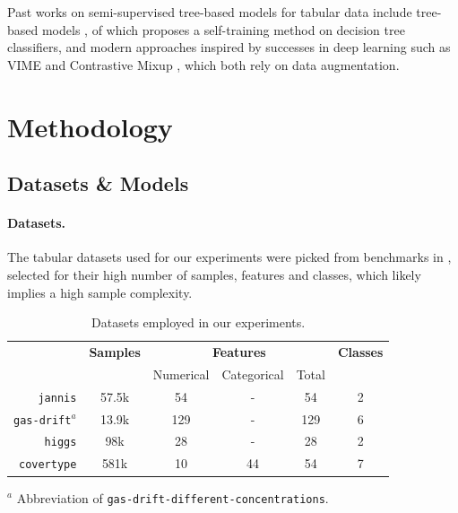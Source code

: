 \documentclass{article}
\begin{document}
Past works on semi-supervised tree-based models for tabular data include
tree-based models \cite{kemp2003semisupervised,levatic2017semisupervised,
tanha2017semisupervised}, of which \cite{tanha2017semisupervised} proposes a
self-training method on decision tree classifiers, and modern approaches inspired by
successes in deep learning such as VIME \cite{yoon2020vime} and Contrastive Mixup
\cite{darabi2021contrastive}, which both rely on data augmentation.

\section{Methodology}\label{sec:met}

\subsection{Datasets \& Models}

\paragraph{Datasets.}
The tabular datasets used for our experiments were picked from benchmarks in
\cite{grinsztajn2022why,shwartz-ziv2021tabular}, selected for their high number of
samples, features and classes, which likely implies a high sample complexity.

\begin{table}[htbp]
  \centering
  \caption{Datasets employed in our experiments.}
  \label{tab:datasets}
  \begin{tabular}{rccccc}
    \toprule
    & \textbf{Samples} & \multicolumn{3}{c}{\textbf{Features}} & \textbf{Classes} \\
    \cmidrule(lr){3-5}
    & & Numerical & Categorical & Total \\
    \midrule
    \small\texttt{jannis} \cite{grinsztajn2022why} & 57.5k & 54 & - & 54 & 2 \\
    \small\texttt{gas-drift}$^a$ \cite{grinsztajn2022why,shwartz-ziv2021tabular}
    & 13.9k & 129 & - & 129 & 6 \\
    \small\texttt{higgs} \cite{grinsztajn2022why,shwartz-ziv2021tabular}
    & 98k & 28 & - & 28 & 2 \\
    \small\texttt{covertype} \cite{shwartz-ziv2021tabular}
    & 581k & 10 & 44 & 54 & 7 \\
    \bottomrule
  \end{tabular}

  \footnotesize{
    $^a$ Abbreviation of \texttt{gas-drift-different-concentrations}.
  }
\end{table}
\end{document}
